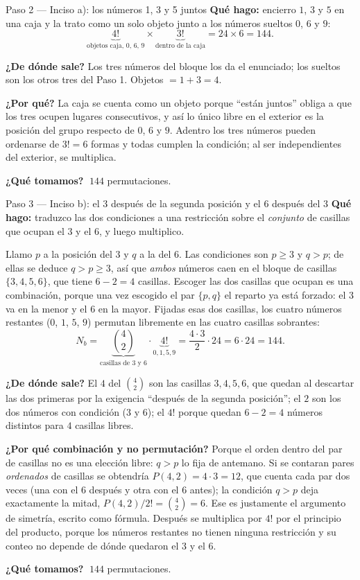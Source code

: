 \documentclass[11pt]{article}
\begin{document}
\begin{paso}{Paso 2 --- Inciso a): los números 1, 3 y 5 juntos}
\textbf{Qué hago:} encierro $1$, $3$ y $5$ en una caja y la trato como un solo objeto junto a los números
sueltos $0$, $6$ y $9$:
\[
\underbrace{4!}_{\text{objetos caja},\,0,\,6,\,9}\times\underbrace{3!}_{\text{dentro de la caja}}
=24\times6=144 .
\]

\textbf{¿De dónde sale?} Los tres números del bloque los da el enunciado; los sueltos son los otros tres
del Paso 1. Objetos $=1+3=4$.

\textbf{¿Por qué?} La caja se cuenta como un objeto porque ``están juntos'' obliga a que los tres ocupen
lugares consecutivos, y así lo único libre en el exterior es la posición del grupo respecto de $0$, $6$ y
$9$. Adentro los tres números pueden ordenarse de $3!=6$ formas y todas cumplen la condición; al ser
independientes del exterior, se multiplica.

\textbf{¿Qué tomamos?} $\;144$ permutaciones.
\end{paso}

\begin{paso}{Paso 3 --- Inciso b): el 3 después de la segunda posición y el 6 después del 3}
\textbf{Qué hago:} traduzco las dos condiciones a una restricción sobre el \emph{conjunto} de casillas que
ocupan el $3$ y el $6$, y luego multiplico.

Llamo $p$ a la posición del $3$ y $q$ a la del $6$. Las condiciones son $p\geq3$ y $q>p$; de ellas se
deduce $q>p\geq3$, así que \emph{ambos} números caen en el bloque de casillas
$\{3,4,5,6\}$, que tiene $6-2=4$ casillas. Escoger las dos casillas que ocupan es una combinación, porque
una vez escogido el par $\{p,q\}$ el reparto ya está forzado: el $3$ va en la menor y el $6$ en la mayor.
Fijadas esas dos casillas, los cuatro números restantes ($0$, $1$, $5$, $9$) permutan libremente en las
cuatro casillas sobrantes:
\[
N_b=\underbrace{\binom{4}{2}}_{\text{casillas de }3\text{ y }6}\cdot\underbrace{4!}_{0,1,5,9}
=\frac{4\cdot 3}{2}\cdot 24=6\cdot 24=144 .
\]

\textbf{¿De dónde sale?} El $4$ del $\binom{4}{2}$ son las casillas $3,4,5,6$, que quedan al descartar las
dos primeras por la exigencia ``después de la segunda posición''; el $2$ son los dos números con condición
($3$ y $6$); el $4!$ porque quedan $6-2=4$ números distintos para $4$ casillas libres.

\textbf{¿Por qué combinación y no permutación?} Porque el orden dentro del par de casillas no es una
elección libre: $q>p$ lo fija de antemano. Si se contaran pares \emph{ordenados} de casillas se obtendría
$P(4,2)=4\cdot 3=12$, que cuenta cada par dos veces (una con el $6$ después y otra con el $6$ antes); la
condición $q>p$ deja exactamente la mitad, $P(4,2)/2!=\binom{4}{2}=6$. Ese es justamente el argumento de
simetría, escrito como fórmula. Después se multiplica por $4!$ por el principio del producto, porque los
números restantes no tienen ninguna restricción y su conteo no depende de dónde quedaron el $3$ y el $6$.

\textbf{¿Qué tomamos?} $\;144$ permutaciones.
\end{paso}
\end{document}
